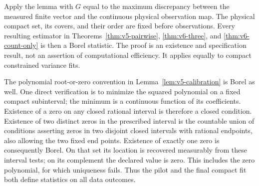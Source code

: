 Apply the lemma with $G$ equal to the maximum discrepancy between the
measured finite vector and the continuous physical observation map.
The physical compact set, its covers, and their order are fixed before
observations. Every resulting estimator in
Theorems~\ref{thm:v5-pairwise}, \ref{thm:v6-three}, and
\ref{thm:v6-count-only} is then a Borel statistic. The proof is an
existence and specification result, not an assertion of computational
efficiency. It applies equally to compact constrained variance fits.

The polynomial root-or-zero convention in
Lemma~\ref{lem:v5-calibration} is Borel as well. One direct verification
is to minimize the squared polynomial on a fixed compact subinterval;
the minimum is a continuous function of its coefficients. Existence of
a zero on any closed rational interval is therefore a closed condition.
Existence of two distinct zeros in the prescribed interval is the
countable union of conditions asserting zeros in two disjoint closed
intervals with rational endpoints, also allowing the two fixed end
points. Existence of exactly one zero is consequently Borel. On that
set its location is recovered measurably from these interval tests;
on its complement the declared value is zero. This includes the zero
polynomial, for which uniqueness fails. Thus the pilot and the final
compact fit both define statistics on all data outcomes.
